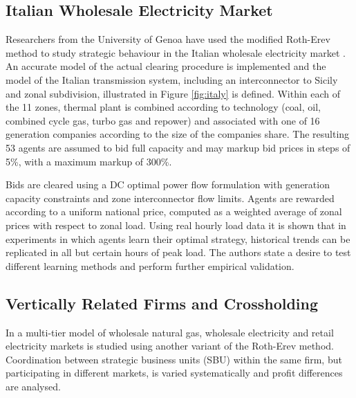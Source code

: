 \subsection{Italian Wholesale Electricity Market}



Researchers from the University of Genoa have used the modified Roth-Erev
method to study strategic behaviour in the Italian wholesale electricity market
\cite{cincotti:09}.  An accurate model of the actual clearing procedure is
implemented and the model of the Italian transmission system, including an
interconnector to Sicily and zonal subdivision, illustrated in Figure
\ref{fig:italy} is defined.  Within each of the 11 zones, thermal plant is
combined according to technology (coal, oil, combined cycle gas, turbo gas and
repower) and associated with one of 16 generation companies according to the
size of the companies share.  The resulting 53 agents are assumed to bid full
capacity and may markup bid prices in steps of 5\%, with a maximum markup of
300\%.


Bids are cleared using a DC optimal power flow formulation with
generation capacity constraints and zone interconnector flow limits.  Agents are
rewarded according to a uniform national price, computed as a weighted average
of zonal prices with respect to zonal load.  Using real hourly load data it
is shown that in experiments in which agents learn their optimal
strategy, historical trends can be replicated in all but certain hours of
peak load.  The authors state a desire to test different learning methods and perform
further empirical validation.

\subsection{Vertically Related Firms and Crossholding}
In  a multi-tier model of wholesale natural gas, wholesale
electricity and retail electricity markets is studied using another variant of
the Roth-Erev method.  Coordination between strategic business units (SBU)
within the same firm, but participating in different markets, is varied
systematically and profit differences are analysed.


